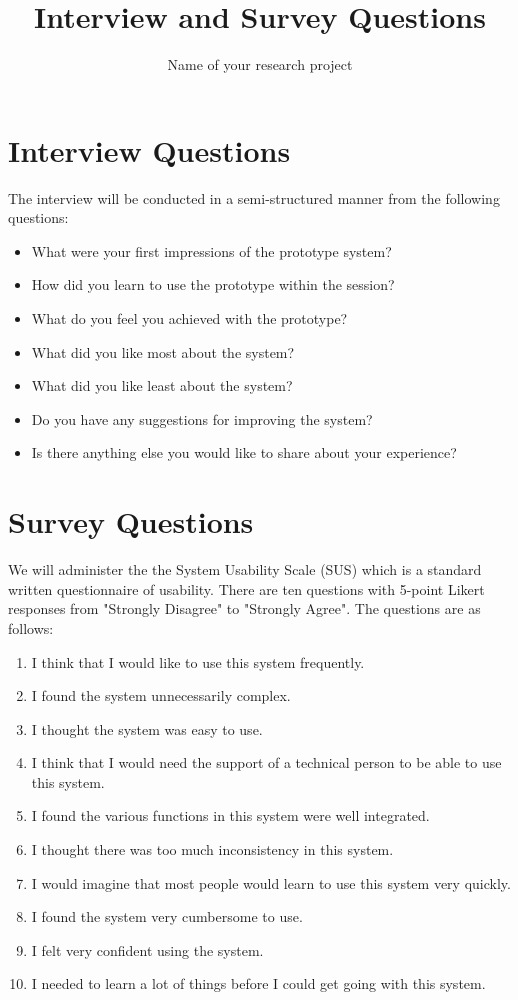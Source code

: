 \documentclass[11pt, a4paper, oneside]{article}
\title{Interview and Survey Questions}
\subtitle{Name of your research project}
\begin{document}
\section{Interview Questions}

The interview will be conducted in a semi-structured manner from the following questions:

\begin{itemize}
    \item What were your first impressions of the prototype system?
    \item How did you learn to use the prototype within the session?
    \item What do you feel you achieved with the prototype?
    \item What did you like most about the system?
    \item What did you like least about the system?
    \item Do you have any suggestions for improving the system?
    \item Is there anything else you would like to share about your experience?
\end{itemize}

\section{Survey Questions}

We will administer the the System Usability Scale (SUS) which is a standard written questionnaire of usability. There are ten questions with 5-point Likert responses from "Strongly Disagree" to "Strongly Agree". The questions are as follows:

\begin{enumerate}
\item I think that I would like to use this system frequently.
\item I found the system unnecessarily complex.
\item I thought the system was easy to use.
\item I think that I would need the support of a technical person to be able to use this system.
\item I found the various functions in this system were well integrated.
\item I thought there was too much inconsistency in this system.
\item I would imagine that most people would learn to use this system very quickly.
\item I found the system very cumbersome to use.
\item I felt very confident using the system.
\item I needed to learn a lot of things before I could get going with this system.
\end{enumerate}
\end{document}
